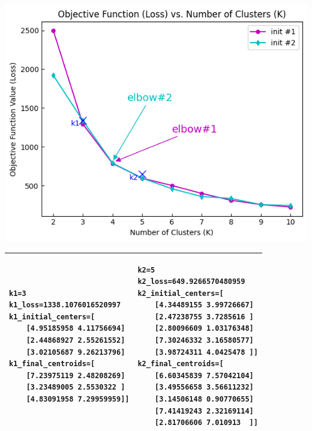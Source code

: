 \documentclass[twocolumn]{article}
\begin{document}
\begin{minipage}[t]{1\textwidth}
    \begin{minipage}[h]{9cm}
        \includegraphics[width=1\textwidth]{strategy1output.png}
    \end{minipage}
    \begin{tabular}[p]{|p{3.5cm}p{3.5cm}|}
        \hline
        \begin{minipage}[t]{3.5cm}
            \begin{verbatim}
k1=3
k1_loss=1338.1076016520997
k1_initial_centers=[
    [4.95185958 4.11756694]
    [2.44868927 2.55261552]
    [3.02105687 9.26213796]
k1_final_centroids=[
    [7.23975119 2.48208269]
    [3.23489005 2.5530322 ]
    [4.83091958 7.29959959]]\end{verbatim}
            \vspace{0.3\baselineskip}
        \end{minipage}
         & \begin{minipage}[t]{3.5cm}
               \begin{verbatim}
k2=5
k2_loss=649.9266570480959
k2_initial_centers=[
    [4.34489155 3.99726667]
    [2.47238755 3.7285616 ]
    [2.80096609 1.03176348]
    [7.30246332 3.16580577]
    [3.98724311 4.0425478 ]]
k2_final_centroids=[
    [6.60345839 7.57042104]
    [3.49556658 3.56611232]
    [3.14506148 0.90770655]
    [7.41419243 2.32169114]
    [2.81706606 7.010913  ]]\end{verbatim}
               \vspace{0.3\baselineskip}
           \end{minipage} \\ \hline
    \end{tabular}
\end{minipage}
\end{document}
